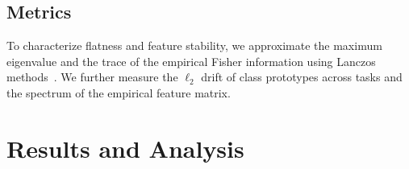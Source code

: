 \documentclass{article}
\theoremstyle{plain}
\theoremstyle{definition}
\theoremstyle{remark}
\begin{document}
\subsection{Metrics}



To characterize flatness and feature stability, we approximate the maximum eigenvalue and the trace of the empirical Fisher information using Lanczos methods~\cite{ghorbaniInvestigationNeuralNet2019,foretSharpnessAwareMinimizationEfficiently2021}.  
We further measure the $\ell_2$ drift of class prototypes across tasks and the spectrum of the empirical feature matrix. 


\section{Results and Analysis}
\label{sec:results}
\end{document}

